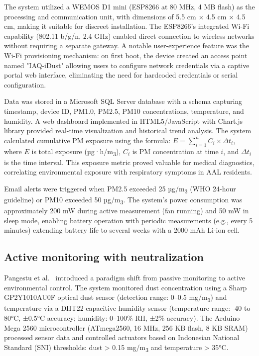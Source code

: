 \documentclass[12pt]{report}
\begin{document}
The system utilized a WEMOS D1 mini (ESP8266 at 80 MHz, 4 MB flash) as the processing and communication unit, with dimensions of 5.5 cm × 4.5 cm × 4.5 cm, making it suitable for discreet installation. The ESP8266's integrated Wi-Fi capability (802.11 b/g/n, 2.4 GHz) enabled direct connection to wireless networks without requiring a separate gateway. A notable user-experience feature was the Wi-Fi provisioning mechanism: on first boot, the device created an access point named "IAQ-iDust" allowing users to configure network credentials via a captive portal web interface, eliminating the need for hardcoded credentials or serial configuration.

Data was stored in a Microsoft SQL Server database with a schema capturing timestamp, device ID, PM1.0, PM2.5, PM10 concentrations, temperature, and humidity. A web dashboard implemented in HTML5/JavaScript with Chart.js library provided real-time visualization and historical trend analysis. The system calculated cumulative PM exposure using the formula: $E = \sum_{i=1}^{n} C_i \times \Delta t_i$, where $E$ is total exposure (µg·h/m\textsubscript{3}), $C_i$ is PM concentration at time $i$, and $\Delta t_i$ is the time interval. This exposure metric proved valuable for medical diagnostics, correlating environmental exposure with respiratory symptoms in AAL residents.

Email alerts were triggered when PM2.5 exceeded 25 µg/m\textsubscript{3} (WHO 24-hour guideline) or PM10 exceeded 50 µg/m\textsubscript{3}. The system's power consumption was approximately 200 mW during active measurement (fan running) and 50 mW in sleep mode, enabling battery operation with periodic measurements (e.g., every 5 minutes) extending battery life to several weeks with a 2000 mAh Li-ion cell.

\subsection{Active monitoring with neutralization}
Pangestu et al.~\cite{pangestu2020} introduced a paradigm shift from passive monitoring to active environmental control. The system monitored dust concentration using a Sharp GP2Y1010AU0F optical dust sensor (detection range: 0--0.5 mg/m\textsubscript{3}) and temperature via a DHT22 capacitive humidity sensor (temperature range: -40 to 80°C, ±0.5°C accuracy; humidity: 0--100\% RH, ±2\% accuracy). The Arduino Mega 2560 microcontroller (ATmega2560, 16 MHz, 256 KB flash, 8 KB SRAM) processed sensor data and controlled actuators based on Indonesian National Standard (SNI) thresholds: dust > 0.15 mg/m\textsubscript{3} and temperature > 35°C.
\end{document}
